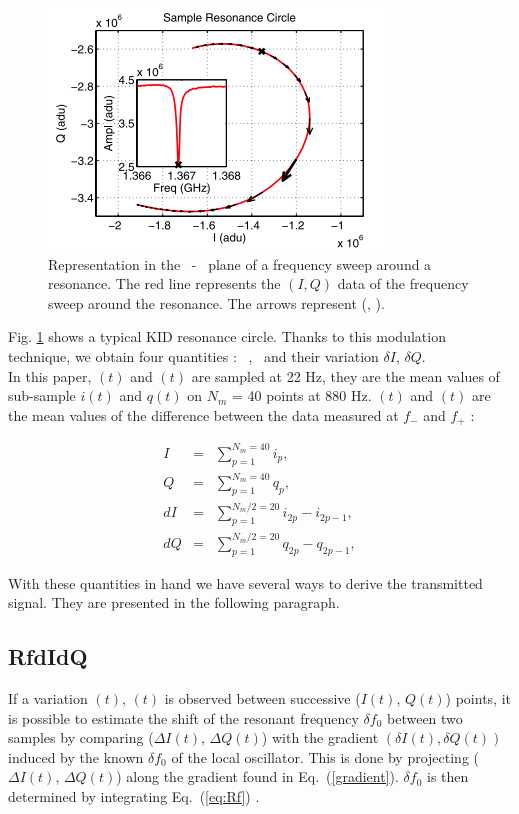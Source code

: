 \begin{figure}[h]
\center
	\includegraphics[scale=0.8]{Figures/resonance-circle.png}
	\caption{Representation in the \I\ - \Q\ plane of a frequency sweep around a resonance. The red line represents the $(I,Q)$ data of the frequency sweep around the resonance. The arrows represent (\di, \dq). \citep{2013A&A...551L..12C}}
	\label{circle-iq}
\end{figure}

Fig. \ref{circle-iq} shows a typical KID resonance circle. Thanks to this
modulation technique, we obtain four quantities : \I\ , \Q\ and their variation
$\delta I$, $\delta Q$.\\ In this paper, \I$(t)$ and \Q$(t)$ are sampled at 22 Hz,
they are the mean values of sub-sample $i(t)$ and $q(t)$ on $N_{m}$ = 40 points at
880 Hz. \di$(t)$ and \dq$(t)$ are the mean values of the difference between the data
measured at $f_{-}$ and $f_{+}$ :

\begin{eqnarray}
I  &=& \sum^{N_{m}=40}_{p=1} i_{p},\\
Q  &=& \sum^{N_{m}=40}_{p=1} q_{p},\\
dI &=& \sum^{N_{m}/2=20}_{p=1} i_{2p} - i_{2p-1},\\
dQ &=& \sum^{N_{m}/2=20}_{p=1} q_{2p} - q_{2p-1},
\end{eqnarray}


With these quantities in hand we have several ways to derive the transmitted signal. They are presented in the following paragraph.

\subsection{RfdIdQ}
If a variation \di$(t)$, \dq$(t)$ is observed between successive  ($I(t)$, $Q(t)$) points, it is possible to estimate the shift of the resonant frequency $\delta f_{0}$ between two samples by comparing ($\Delta I(t)$, $\Delta Q(t)$) with the gradient $(\delta I(t), \delta Q(t)) $ induced by the known $\delta f_{0}$ of the local oscillator. This is done by projecting ($\Delta I(t)$, $\Delta Q(t)$) along the gradient found in Eq.~(\ref{gradient}). $\delta f_{0}$ is then determined by integrating Eq.~(\ref{eq:Rf}) \citep{2014A&A...569A...9C}.

